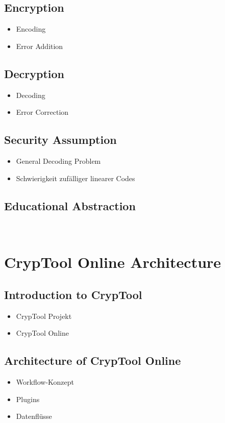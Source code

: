 \documentclass[a4paper,11pt]{article}
\begin{document}
\subsection{Encryption}
\begin{itemize}
	\item Encoding
	\item Error Addition
\end{itemize}

\subsection{Decryption}
\begin{itemize}
	\item Decoding
	\item Error Correction
\end{itemize}

\subsection{Security Assumption}
\begin{itemize}
	\item General Decoding Problem
	\item Schwierigkeit zufälliger linearer Codes
\end{itemize}

\subsection{Educational Abstraction}
\ %

\section{CrypTool Online Architecture}

\subsection{Introduction to CrypTool}
\begin{itemize}
	\item CrypTool Projekt
	\item CrypTool Online
\end{itemize}

\subsection{Architecture of CrypTool Online}
\begin{itemize}
	\item Workflow-Konzept
	\item Plugins
	\item Datenflüsse
\end{itemize}
\end{document}

